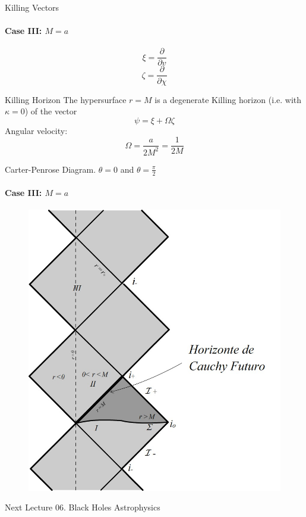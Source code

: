 \documentclass{beamer}
\begin{document}
\begin{darkframes}
        \begin{frame}{Killing Vectors}
       		\framesubtitle{Case III: $M=a$}
            $$\xi=\frac{\partial}{\partial v}$$
 			$$\zeta=\frac{\partial}{\partial\chi}$$
        \end{frame}
        
        \begin{frame}{Killing Horizon}
       		The hypersurface $r=M$ is a degenerate Killing horizon (i.e. with
            $\kappa=0$) of the vector
            $$\psi=\xi+\Omega\zeta$$
            \pause
            Angular velocity:
            $$\Omega=\frac{a}{2M^{2}}=\frac{1}{2M}$$
        \end{frame}

  \end{darkframes}

         \begin{frame}{Carter-Penrose Diagram. $\theta=0$ and $\theta= \frac{\pi}{2}$}
      \framesubtitle{Case III: $M=a$}
        	\begin{center}
				\begin{figure}
				\includegraphics[scale=0.75] {figures/fig42.jpg}
				\end{figure}
			\end{center}	
        \end{frame}
        
  \begin{darkframes}
        
  		\begin{frame}{Next Lecture}
        	\Large
			{06. Black Holes Astrophysics}
		\end{frame}
  
  \end{darkframes}
\end{document}
